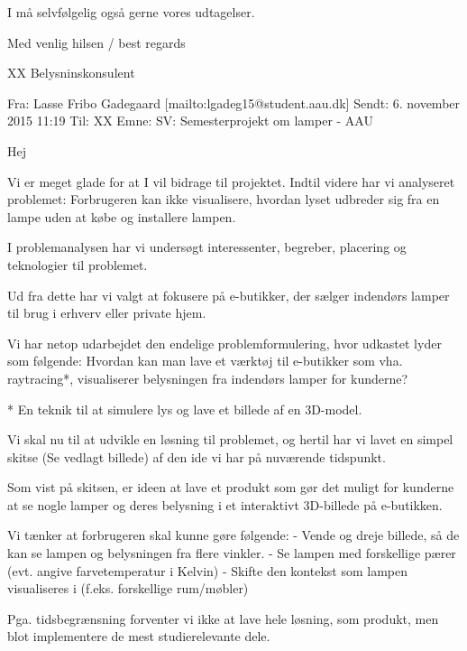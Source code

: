 \documentclass[oneside,a4paper,titlepage]{article}
\begin{document}
\begin{itemize}
I må selvfølgelig også gerne vores udtagelser.  

Med venlig hilsen / best regards

XX\newline
Belysninskonsulent

\noindent\makebox[\linewidth]{\rule{\paperwidth}{0.4pt}}

Fra: Lasse Fribo Gadegaard [mailto:lgadeg15@student.aau.dk] \newline
Sendt: 6. november 2015 11:19\newline
Til: XX\newline
Emne: SV: Semesterprojekt om lamper - AAU

Hej 
 
Vi er meget glade for at I vil bidrage til projektet. Indtil videre har vi analyseret problemet: 
Forbrugeren kan ikke visualisere, hvordan lyset udbreder sig fra en lampe uden at købe og installere lampen. 

I problemanalysen har vi undersøgt interessenter, begreber, placering og teknologier til problemet. 

Ud fra dette har vi valgt at fokusere på e-butikker, der sælger indendørs lamper til brug i erhverv eller private hjem. 

Vi har netop udarbejdet den endelige problemformulering, hvor udkastet lyder som følgende:
Hvordan kan man lave et værktøj til e-butikker som vha. raytracing*, visualiserer belysningen fra indendørs lamper for kunderne? 

* En teknik til at simulere lys og lave et billede af en 3D-model. 

Vi skal nu til at udvikle en løsning til problemet, og hertil har vi lavet en simpel skitse (Se vedlagt billede) af den ide vi har på nuværende tidspunkt. 
 
Som vist på skitsen, er ideen at lave et produkt som gør det muligt for kunderne at se nogle lamper og deres belysning i et interaktivt 3D-billede på e-butikken. 

Vi tænker at forbrugeren skal kunne gøre følgende: \newline
 - Vende og dreje billede, så de kan se lampen og belysningen fra flere vinkler. \newline
 - Se lampen med forskellige pærer (evt. angive farvetemperatur i Kelvin) \newline
 - Skifte den kontekst som lampen visualiseres i (f.eks. forskellige rum/møbler)

Pga. tidsbegrænsning forventer vi ikke at lave hele løsning, som produkt, men blot implementere de mest studierelevante dele. 


\end{itemize}
\end{document}
